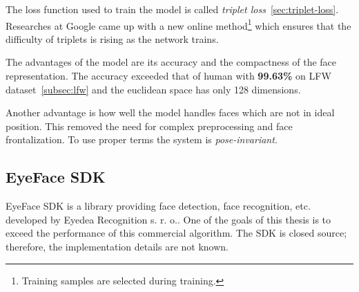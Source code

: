 The loss function used to train the model is called \textit{triplet loss}~\ref{sec:triplet-loss}.
Researches at Google came up with a new online method\footnote{Training samples are selected during training.} which
ensures that the difficulty of triplets is rising as the network trains.

The advantages of the model are its accuracy and the compactness of the face representation.
The accuracy exceeded that of human with \textbf{99.63\%} on LFW dataset~\ref{subsec:lfw} and the euclidean space has
only 128 dimensions.

Another advantage is how well the model handles faces which are not in ideal position.
This removed the need for complex preprocessing and face frontalization.
To use proper terms the system is \textit{pose-invariant}.

\subsection{EyeFace SDK}\label{subsec:eyeface}
EyeFace SDK is a library providing face detection, face recognition, etc. developed by Eyedea Recognition s. r. o..
One of the goals of this thesis is to exceed the performance of this commercial algorithm.
The SDK is closed source; therefore, the implementation details are not known.